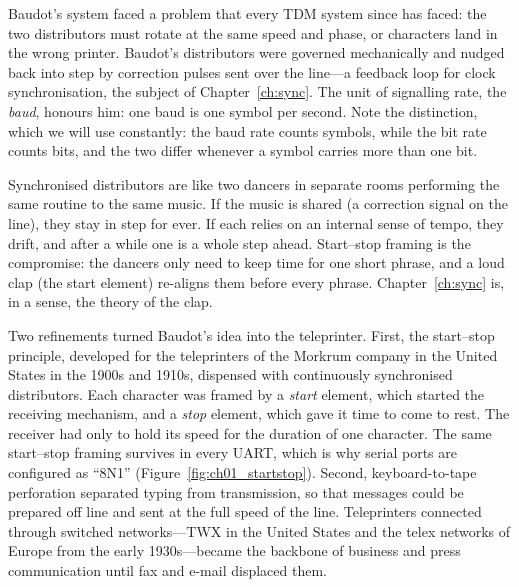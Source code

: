 Baudot's system faced a problem that every TDM system since has faced: the two distributors must
rotate at the same speed and phase, or characters land in the wrong printer. Baudot's distributors
were governed mechanically and nudged back into step by correction pulses sent over the line---a
feedback loop for clock synchronisation, the subject of Chapter~\ref{ch:sync}. The unit of signalling
rate, the \emph{baud}, honours him: one baud is one symbol per second. Note the distinction, which we
will use constantly: the baud rate counts symbols, while the bit rate counts bits, and the two differ
whenever a symbol carries more than one bit.

\begin{analogy}
Synchronised distributors are like two dancers in separate rooms performing the same routine to the
same music. If the music is shared (a correction signal on the line), they stay in step for ever. If
each relies on an internal sense of tempo, they drift, and after a while one is a whole step ahead.
Start--stop framing is the compromise: the dancers only need to keep time for one short phrase, and
a loud clap (the start element) re-aligns them before every phrase. Chapter~\ref{ch:sync} is, in a
sense, the theory of the clap.
\end{analogy}

Two refinements turned Baudot's idea into the teleprinter. First, the start--stop principle,
developed for the teleprinters of the Morkrum company in the United States in the 1900s and
1910s, dispensed with continuously synchronised distributors. Each character was framed by a
\emph{start} element, which started the receiving mechanism, and a \emph{stop} element, which gave it
time to come to rest. The receiver had only to hold its speed for the duration of one character. The
same start--stop framing survives in every UART, which is why serial ports are configured as ``8N1''
(Figure~\ref{fig:ch01_startstop}). Second, keyboard-to-tape perforation separated typing from
transmission, so that messages could be prepared off line and sent at the full speed of the line.
Teleprinters connected through switched networks---TWX in the United States and the telex networks of
Europe from the early 1930s---became the backbone of business and press communication until fax and
e-mail displaced them.


